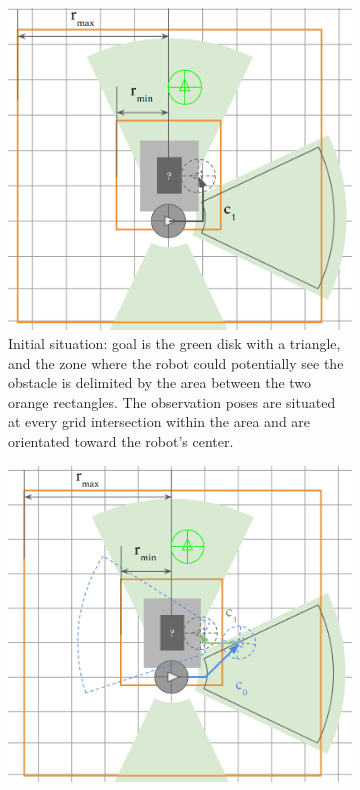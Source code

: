 \begin{figure}[H]
\centering
\begin{subfigure}{.48\textwidth}
  \centering
  \includegraphics[width=\linewidth]{Figures/Observation_Proposition/Observation_01.png}
  \caption{Initial situation: goal is the green disk with a triangle, and the zone where the robot could potentially see the obstacle is delimited by the area between the two orange rectangles. The observation poses are situated at every grid intersection within the area and are orientated toward the robot's center.}
  \label{fig:observation_01}
\end{subfigure}\hspace*{\fill}
\begin{subfigure}{.48\textwidth}
  \centering
  \includegraphics[width=\linewidth]{Figures/Observation_Proposition/Observation_02.png}

\end{subfigure}
\end{figure}

